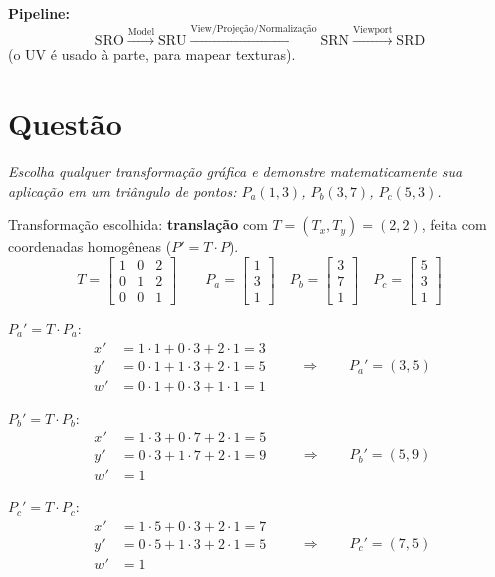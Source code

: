 \documentclass{article}
\newcounter{questao}
\newcommand{\questao}[1]{%
      \stepcounter{questao}%
      \section*{Questão \arabic{questao}}%
      \textit{#1}\par\medskip}
\begin{document}
\textbf{Pipeline:}
\[
      \text{SRO} \xrightarrow{\text{Model}} \text{SRU} \xrightarrow{\text{View/Projeção/Normalização}} \text{SRN} \xrightarrow{\text{Viewport}} \text{SRD}
\]
(o UV é usado à parte, para mapear texturas).

\questao{Escolha qualquer transformação gráfica e demonstre matematicamente sua aplicação em um triângulo de pontos: $P_a(1,3)$, $P_b(3,7)$, $P_c(5,3)$.}

Transformação escolhida: \textbf{translação} com $T = (T_x, T_y) = (2, 2)$, feita com coordenadas homogêneas ($P' = T \cdot P$).
\[
      T =
      \begin{bmatrix}
            1 & 0 & 2 \\
            0 & 1 & 2 \\
            0 & 0 & 1
      \end{bmatrix}
      \qquad
      P_a = \begin{bmatrix} 1 \\ 3 \\ 1 \end{bmatrix}
      \quad
      P_b = \begin{bmatrix} 3 \\ 7 \\ 1 \end{bmatrix}
      \quad
      P_c = \begin{bmatrix} 5 \\ 3 \\ 1 \end{bmatrix}
\]

$P_a' = T \cdot P_a$:
\[
      \begin{aligned}
            x' &= 1\cdot1 + 0\cdot3 + 2\cdot1 = 3 \\
            y' &= 0\cdot1 + 1\cdot3 + 2\cdot1 = 5 \\
            w' &= 0\cdot1 + 0\cdot3 + 1\cdot1 = 1
      \end{aligned}
      \qquad\Rightarrow\qquad P_a' = (3, 5)
\]

$P_b' = T \cdot P_b$:
\[
      \begin{aligned}
            x' &= 1\cdot3 + 0\cdot7 + 2\cdot1 = 5 \\
            y' &= 0\cdot3 + 1\cdot7 + 2\cdot1 = 9 \\
            w' &= 1
      \end{aligned}
      \qquad\Rightarrow\qquad P_b' = (5, 9)
\]

$P_c' = T \cdot P_c$:
\[
      \begin{aligned}
            x' &= 1\cdot5 + 0\cdot3 + 2\cdot1 = 7 \\
            y' &= 0\cdot5 + 1\cdot3 + 2\cdot1 = 5 \\
            w' &= 1
      \end{aligned}
      \qquad\Rightarrow\qquad P_c' = (7, 5)
\]
\end{document}
